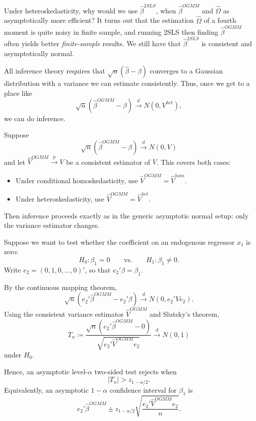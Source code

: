 Under heteroskedasticity, why would we use $\hat{\beta}^{2SLS}$, when $\hat{\beta}^{OGMM}$ and $\hat{\Omega}$ as asymptotically more efficient? It turns out that the estimation $\hat{\Omega}$ of a fourth moment is quite noisy in finite sample, and running 2SLS then finding $\hat{\beta}^{OGMM}$ often yields better \emph{finite-sample} results. We still have that $\hat{\beta}^{2SLS}$ is consistent and asymptotically normal.

All inference theory requires that $\sqrt{n} \left( \hat{\beta} - \beta \right)$ converges to a Gaussian distribution with a variance we can estimate consistently. Thus, once we get to a place like \[
	\sqrt{n} \left( \hat{\beta}^{OGMM}- \beta \right) \xrightarrow{d} N\left( 0, V^{het} \right)
,\] we can do inference.

\begin{remark}
	Suppose
	\[
		\sqrt{n}\left(\hat{\beta}^{OGMM}-\beta\right)\xrightarrow{d}N(0,V)
	\]
	and let $\hat{V}^{OGMM}\xrightarrow{p}V$ be a consistent estimator of $V$.
	This covers both cases:
	\begin{itemize}
		\item Under conditional homoskedasticity, use $\hat{V}^{OGMM}=\hat{V}^{hom}$.
		\item Under heteroskedasticity, use $\hat{V}^{OGMM}=\hat{V}^{het}$.
	\end{itemize}
	Then inference proceeds exactly as in the generic asymptotic normal setup: only the variance estimator changes.
\end{remark}

\begin{example}
	Suppose we want to test whether the coefficient on an endogenous regressor $x_1$ is zero:
	\[
		H_0:\beta_1=0
		\qquad\text{vs.}\qquad
		H_1:\beta_1\ne 0
	.\]
	Write $e_2=(0,1,0,\ldots,0)'$, so that $e_2'\beta=\beta_1$.

	By the continuous mapping theorem,
	\[
		\sqrt{n}\left(e_2'\hat{\beta}^{OGMM}-e_2'\beta\right)
		\xrightarrow{d}N\left(0,e_2'Ve_2\right)
	.\]
	Using the consistent variance estimator $\hat{V}^{OGMM}$ and Slutsky's theorem,
	\[
		T_n
		\coloneqq
		\frac{\sqrt{n}\left(e_2'\hat{\beta}^{OGMM}-0\right)}
		{\sqrt{e_2'\hat{V}^{OGMM}e_2}}
		\xrightarrow{d}N(0,1)
	\]
	under $H_0$.

	Hence, an asymptotic level-$\alpha$ two-sided test rejects when
	\[
		|T_n|>z_{1-\alpha/2}
	.\]
	Equivalently, an asymptotic $1-\alpha$ confidence interval for $\beta_1$ is
	\[
		e_2'\hat{\beta}^{OGMM} \pm z_{1-\alpha/2}\sqrt{\frac{e_2'\hat{V}^{OGMM}e_2}{n}}
	.\]
\end{example}

